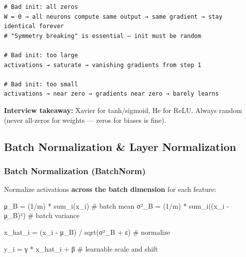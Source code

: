 \documentclass[11pt]{article}
\newenvironment{Shaded}{\begin{snugshade}}{\end{snugshade}}
\newcommand{\CommentTok}[1]{\textcolor[rgb]{0.48,0.49,0.49}{#1}}
\newcommand{\DecValTok}[1]{\textcolor[rgb]{0.96,0.45,0.00}{#1}}
\newcommand{\NormalTok}[1]{\textcolor[rgb]{0.81,0.81,0.76}{#1}}
\newcommand{\OperatorTok}[1]{\textcolor[rgb]{0.81,0.81,0.76}{#1}}
\begin{document}
\setcodelang{}

\begin{verbatim}
# Bad init: all zeros
W = 0 → all neurons compute same output → same gradient → stay identical forever
# "Symmetry breaking" is essential — init must be random

# Bad init: too large
activations → saturate → vanishing gradients from step 1

# Bad init: too small  
activations → near zero → gradients near zero → barely learns
\end{verbatim}

\textbf{Interview takeaway:} Xavier for tanh/sigmoid, He for ReLU. Always random (never all-zeros for weights --- zeros for biases is fine).

\subsection{Batch Normalization \& Layer Normalization}\label{batch-normalization--layer-normalization}

\subsubsection{Batch Normalization (BatchNorm)}\label{batch-normalization-batchnorm}

Normalize activations \textbf{across the batch dimension} for each feature:


\begin{Shaded}
\begin{Highlighting}[]
\NormalTok{μ\_B }\OperatorTok{=}\NormalTok{ (}\DecValTok{1}\OperatorTok{/}\NormalTok{m) }\OperatorTok{*}\NormalTok{ sum\_i(x\_i)          }\CommentTok{\# batch mean}
\NormalTok{σ²\_B }\OperatorTok{=}\NormalTok{ (}\DecValTok{1}\OperatorTok{/}\NormalTok{m) }\OperatorTok{*}\NormalTok{ sum\_i((x\_i }\OperatorTok{{-}}\NormalTok{ μ\_B)²) }\CommentTok{\# batch variance}

\NormalTok{x\_hat\_i }\OperatorTok{=}\NormalTok{ (x\_i }\OperatorTok{{-}}\NormalTok{ μ\_B) }\OperatorTok{/}\NormalTok{ sqrt(σ²\_B }\OperatorTok{+}\NormalTok{ ε)   }\CommentTok{\# normalize}

\NormalTok{y\_i }\OperatorTok{=}\NormalTok{ γ }\OperatorTok{*}\NormalTok{ x\_hat\_i }\OperatorTok{+}\NormalTok{ β             }\CommentTok{\# learnable scale and shift}
\end{Highlighting}
\end{Shaded}
\end{document}
